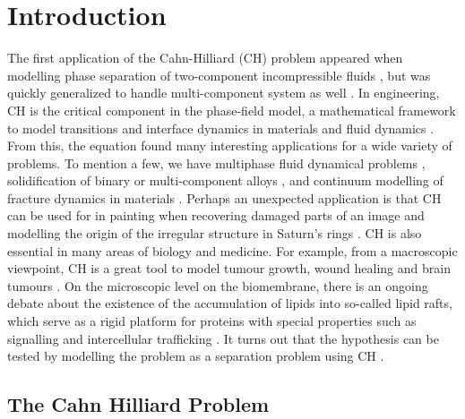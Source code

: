 \section{Introduction}\label{sec:introduction}


The first application of the Cahn-Hilliard (CH) problem appeared when modelling phase separation of two-component incompressible fluids \cite{cahn1958free, cahn1959free, cahn1961spinodal}, but was quickly generalized to handle multi-component system
as well \cite{bosch2015fractional, eyre1993systems, toth2016phase, miranville2017cahn}. In engineering, CH is the critical component in
the phase-field model, a mathematical framework to model transitions and interface dynamics in materials and fluid dynamics \cite{steinbach2009phase, chen2002phase}.
From this, the equation found many interesting applications for a wide variety of problems. To mention a few, we have
multiphase fluid dynamical problems \cite{badalassi2003computation, li2016lattice, kim2012phase, shen2010phase}, solidification of binary or multi-component alloys \cite{kim1999phase, echebarria2004quantitative}, and continuum modelling of fracture dynamics in
materials \cite{kuhn2010continuum, li2015phase}. Perhaps an unexpected application is that CH can be used for in painting when recovering damaged parts of an image \cite{bertozzi2006inpainting, burger2009cahn, bosch2015fractional, brkic2020image}
and modelling the origin of the irregular structure in Saturn's rings \cite{tremaine2003origin}.
CH is also essential in many areas of biology and medicine. For example, from a macroscopic viewpoint, CH is a great tool to model tumour growth, wound healing and brain tumours \cite{agosti2017cahn, cristini2009nonlinear}.
On the microscopic level on the biomembrane, there is an ongoing debate about the existence of the accumulation of lipids into so-called lipid rafts, which serve as a rigid platform for proteins with
special properties such as signalling and intercellular trafficking \cite{ levental2020lipid, hancock2006lipid, munro2003lipid, simons1997functional}. It turns out that the hypothesis can be tested by modelling the problem as a separation problem using
CH \cite{miller2020divide, garcke2016coupled, yushutin2019computational}.

\subsection{The Cahn Hilliard Problem}%
\label{sub:the_equations}

